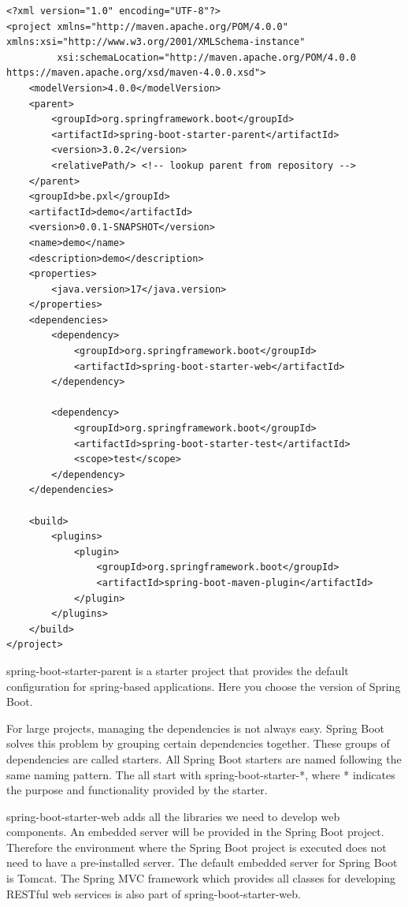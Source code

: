 \documentclass[a4paper, 12pt]{report}
\begin{document}
\begin{lstlisting}[frame=single]
<?xml version="1.0" encoding="UTF-8"?>
<project xmlns="http://maven.apache.org/POM/4.0.0" xmlns:xsi="http://www.w3.org/2001/XMLSchema-instance"
         xsi:schemaLocation="http://maven.apache.org/POM/4.0.0 https://maven.apache.org/xsd/maven-4.0.0.xsd">
    <modelVersion>4.0.0</modelVersion>
    <parent>
        <groupId>org.springframework.boot</groupId>
        <artifactId>spring-boot-starter-parent</artifactId>
        <version>3.0.2</version>
        <relativePath/> <!-- lookup parent from repository -->
    </parent>
    <groupId>be.pxl</groupId>
    <artifactId>demo</artifactId>
    <version>0.0.1-SNAPSHOT</version>
    <name>demo</name>
    <description>demo</description>
    <properties>
        <java.version>17</java.version>
    </properties>
    <dependencies>
        <dependency>
            <groupId>org.springframework.boot</groupId>
            <artifactId>spring-boot-starter-web</artifactId>
        </dependency>

        <dependency>
            <groupId>org.springframework.boot</groupId>
            <artifactId>spring-boot-starter-test</artifactId>
            <scope>test</scope>
        </dependency>
    </dependencies>

    <build>
        <plugins>
            <plugin>
                <groupId>org.springframework.boot</groupId>
                <artifactId>spring-boot-maven-plugin</artifactId>
            </plugin>
        </plugins>
    </build>
</project>
\end{lstlisting}

spring-boot-starter-parent is a starter project that provides the default configuration for spring-based applications. Here you choose the version of Spring Boot.

For large projects, managing the dependencies is not always easy. Spring Boot solves this problem by grouping certain dependencies together. These groups of dependencies are called starters. All Spring Boot starters are named following the same naming pattern. The all start with spring-boot-starter-*, where * indicates the purpose and functionality provided by the starter.

spring-boot-starter-web adds all the libraries we need to develop web components. An embedded server will be provided in the Spring Boot project. Therefore the environment where the Spring Boot project is executed does not need to have a pre-installed server. The default embedded server for Spring Boot is Tomcat. The Spring MVC framework which provides all classes for developing RESTful web services is also part of spring-boot-starter-web.
\end{document}
